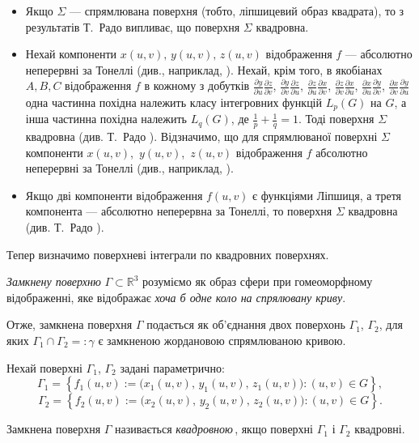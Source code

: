 \documentclass[11pt, reqno]{amsart}
\begin{document}
 \begin{itemize}
\item 
Якщо $\Sigma$ --- спрямлювана поверхня (тобто, ліпшицевий образ квадрата),
 то з результатів Т.~Радо \cite[IV.4.28, IV.4.1~(e)]{Rado} випливає, що поверхня $\Sigma$ квадровна.

\item 
Нехай компоненти $x(u,v),\,y(u,v),\,z(u,v)$ відображення
$f$ --- абсолютно неперервні за Тонеллі (див., наприклад,
\cite[с.~169]{Saks}). Нехай, крім того, в якобіанах $A,B,C$
відображення $f$ в кож\-но\-му з добутків $\frac{\partial y}{\partial
u}\frac{\partial z}{\partial v}$, $\frac{\partial y}{\partial
v}\frac{\partial z}{\partial u}$, $\frac{\partial z}{\partial
u}\frac{\partial x}{\partial v}$, $\frac{\partial z}{\partial
v}\frac{\partial x}{\partial u}$, $\frac{\partial x}{\partial
u}\frac{\partial y}{\partial v}$, $\frac{\partial x}{\partial
v}\frac{\partial y}{\partial u}$ одна час\-тин\-на похідна належить
класу інтегровних функцій $L_p(G)$ на $G$, а інша частинна похідна
належить $L_q(G)$, де $\frac{1}{p}+\frac{1}{q}=1$. Тоді поверхня $\Sigma$
квадровна (див. Т.~Радо \cite[V.2.26]{Rado}). Від\-зна\-чи\-мо, що для спрямлюваної
поверхні $\Sigma$ компоненти $x(u,v)$,\, $y(u,v)$,\, $z(u,v)$
відображення $f$ абсолютно неперервні за  Тонеллі (див., наприклад,
\cite[с.~169]{Saks}).

\item 
Якщо дві компоненти відображення $f(u,v)$ є функціями Ліпшиця, а третя компонента ---
абсолютно неперервна за Тонеллі, то поверхня $\Sigma$ квадровна (див. Т.~Радо
\cite[V.2.28]{Rado}).
\end{itemize}

Тепер визначимо поверхневі інтеграли по квадровних поверхнях.

{\it Замкнену поверхню} $\Gamma\subset\mathbb{R}^3$ розуміємо як
образ сфери при гомеоморфному відображенні, яке відображає {\it
хоча б одне коло на спрялювану криву}.

Отже, замкнена
поверхня $\Gamma$ подається як об'єднання двох поверхонь $\Gamma_1$,
$\Gamma_2$, для яких $\Gamma_1\cap\Gamma_2=:\gamma$ є замкненою
жордановою спрямлюваною кривою. 

Нехай поверхні $\Gamma_1$, $\Gamma_2$ задані параметрично:
$$
\Gamma_1=\left\{f_1(u,v):=\big(x_1(u,v),\,y_1(u,v),\,z_1(u,v)\big):(u,v)\in
G\right\},
$$
$$
\Gamma_2=\left\{f_2(u,v):=\big(x_2(u,v),\,y_2(u,v),\,z_2(u,v)\big):(u,v)\in
G\right\}.$$

Замкнена поверхня $\Gamma$ називається {\it квадровною}\,, якщо
поверхні $\Gamma_1$ і $\Gamma_2$ квадровні.
\end{document}
